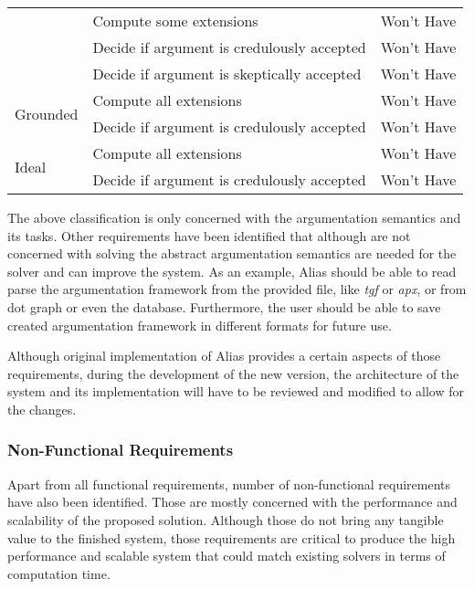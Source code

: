 \begin{table}[]
\begin{tabular}{|l|l|l|}
		& Compute some extensions                          & Won't Have      \\ \cline{2-3} 
		& Decide if argument is credulously accepted & Won't Have      \\ \cline{2-3} 
		& Decide if argument is skeptically accepted & Won't Have      \\ \hline
		\multirow{2}{*}{Grounded}    & Compute all extensions                           & Won't Have      \\ \cline{2-3} 
		& Decide if argument is credulously accepted & Won't Have      \\ \hline
		\multirow{2}{*}{Ideal}       & Compute all extensions                           & Won't Have      \\ \cline{2-3} 
		& Decide if argument is credulously accepted & Won't Have      \\ \hline
	\end{tabular}
\end{table}


The above classification is only concerned with the argumentation semantics and its tasks. Other requirements have been identified that although are not concerned with solving the abstract argumentation semantics are needed for the solver and can improve the system. As an example, Alias should be able to read parse the argumentation framework from the provided file, like \textit{tgf} or \textit{apx}, or from dot graph or even the database. Furthermore, the user should be able to save created argumentation framework in different formats for future use. 

Although original implementation of Alias provides a certain aspects of those requirements, during the development of the new version, the architecture of the system and its implementation will have to be reviewed and modified to allow for the changes.

\subsubsection{Non-Functional Requirements}
Apart from all functional requirements, number of non-functional requirements have also been identified. Those are mostly concerned with the performance and scalability of the proposed solution. Although those do not bring any tangible value to the finished system, those requirements are critical to produce the high performance and scalable system that could match existing solvers in terms of computation time. 

